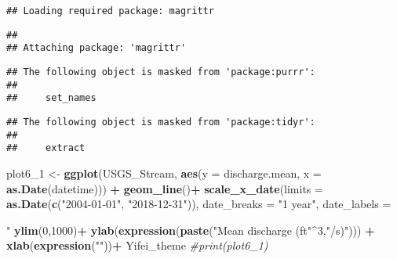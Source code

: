 \documentclass[]{article}
\newenvironment{Shaded}{\begin{snugshade}}{\end{snugshade}}
\newcommand{\KeywordTok}[1]{\textcolor[rgb]{0.13,0.29,0.53}{\textbf{#1}}}
\newcommand{\DataTypeTok}[1]{\textcolor[rgb]{0.13,0.29,0.53}{#1}}
\newcommand{\DecValTok}[1]{\textcolor[rgb]{0.00,0.00,0.81}{#1}}
\newcommand{\StringTok}[1]{\textcolor[rgb]{0.31,0.60,0.02}{#1}}
\newcommand{\CommentTok}[1]{\textcolor[rgb]{0.56,0.35,0.01}{\textit{#1}}}
\newcommand{\OperatorTok}[1]{\textcolor[rgb]{0.81,0.36,0.00}{\textbf{#1}}}
\newcommand{\NormalTok}[1]{#1}
\begin{document}
\begin{verbatim}
## Loading required package: magrittr
\end{verbatim}

\begin{verbatim}
## 
## Attaching package: 'magrittr'
\end{verbatim}

\begin{verbatim}
## The following object is masked from 'package:purrr':
## 
##     set_names
\end{verbatim}

\begin{verbatim}
## The following object is masked from 'package:tidyr':
## 
##     extract
\end{verbatim}

\begin{Shaded}
\begin{Highlighting}[]
\NormalTok{plot6_}\DecValTok{1}\NormalTok{ <-}\StringTok{ }\KeywordTok{ggplot}\NormalTok{(USGS_Stream, }\KeywordTok{aes}\NormalTok{(}\DataTypeTok{y =}\NormalTok{ discharge.mean, }\DataTypeTok{x =} \KeywordTok{as.Date}\NormalTok{(datetime))) }\OperatorTok{+}
\StringTok{  }\KeywordTok{geom_line}\NormalTok{()}\OperatorTok{+}
\StringTok{  }\KeywordTok{scale_x_date}\NormalTok{(}\DataTypeTok{limits =} \KeywordTok{as.Date}\NormalTok{(}\KeywordTok{c}\NormalTok{(}\StringTok{"2004-01-01"}\NormalTok{, }\StringTok{"2018-12-31"}\NormalTok{)),}
 \DataTypeTok{date_breaks =} \StringTok{"1 year"}\NormalTok{, }\DataTypeTok{date_labels =} \StringTok{"%Y"}\NormalTok{) }\OperatorTok{+}
\StringTok{  }\KeywordTok{ylim}\NormalTok{(}\DecValTok{0}\NormalTok{,}\DecValTok{1000}\NormalTok{)}\OperatorTok{+}
\StringTok{  }\KeywordTok{ylab}\NormalTok{(}\KeywordTok{expression}\NormalTok{(}\KeywordTok{paste}\NormalTok{(}\StringTok{"Mean discharge (ft"}\OperatorTok{^}\DecValTok{3}\NormalTok{,}\StringTok{"/s)"}\NormalTok{))) }\OperatorTok{+}
\StringTok{  }\KeywordTok{xlab}\NormalTok{(}\KeywordTok{expression}\NormalTok{(}\StringTok{""}\NormalTok{))}\OperatorTok{+}
\StringTok{  }\NormalTok{Yifei_theme}
\CommentTok{#print(plot6_1)}

}
\end{Highlighting}
\end{Shaded}
\end{document}
